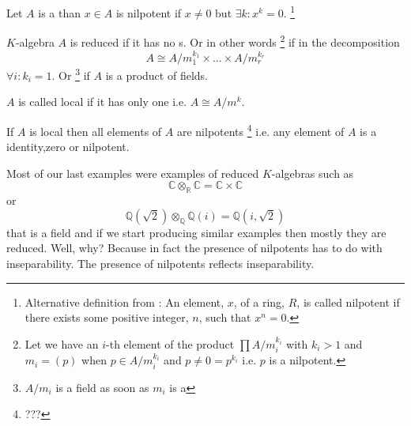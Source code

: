 \begin{definition}
  Let $A$ is a  than $x \in A$ is nilpotent if $x \ne 0$ but
  $\exists k: x^k = 0$.
  \footnote{
    Alternative definition from \cite{wiki:nilpotent}: An element,
    $x$, of a ring, $R$, is called nilpotent if there exists 
    some positive integer, $n$, such that $x^n = 0$.
  }
  \label{def:nilpotent}
\end{definition}

\begin{definition}[reduced]
  $K$-algebra $A$ is reduced if it has no s.
  Or in other words
  \footnote{
    Let we have an $i$-th element of the product $\prod A/m_i^{k_i}$
    with $k_i > 1$ and $m_i  = (p)$ when 
    $p \in A/m_i^{k_i}$ and $p \ne 0 = p^{k_i}$ i.e. $p$ is a
    nilpotent. 
  }
  if in the decomposition
  \[
  A \cong A/m_1^{k_1} \times \dots \times A/m_r^{k_r}
  \]
  $\forall i: k_i = 1$.
  Or 
  \footnote{
    $A/m_i$ is a field as soon as $m_i$ is a 
  }
  if $A$ is a product of fields. 
  \label{def:reduced}
\end{definition}

\begin{definition}[local]
   $A$ is called local if it has only one
   i.e. $A \cong A/m^k$. 
  \label{def:local}
\end{definition}

If $A$ is local then all elements of $A$ are nilpotents
\footnote{
  ???
} i.e. any element of $A$ is a identity,zero or nilpotent.

Most of our last examples were examples of reduced $K$-algebras such
as
\[
\mathbb{C} \otimes_{\mathbb{R}} \mathbb{C} =
\mathbb{C} \times \mathbb{C}
\]
or
\[
\mathbb{Q}\left(\sqrt{2}\right) \otimes_{\mathbb{Q}}
\mathbb{Q}\left(i\right) =
\mathbb{Q}\left(i, \sqrt{2}\right)
\]
that is a field and if we start producing similar examples then mostly
they are reduced. Well, why? Because in fact the presence of
nilpotents has to do with inseparability. The presence of nilpotents
reflects inseparability.

